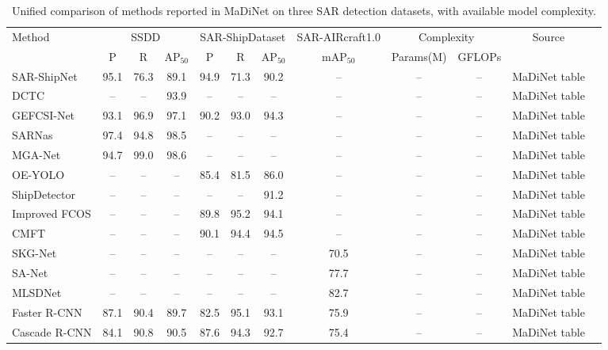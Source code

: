 \documentclass[10pt]{article}
\newcommand{\na}{--}
\begin{document}
\begin{landscape}
\begin{table}
\centering
\scriptsize
\setlength{\tabcolsep}{2.4pt}
\renewcommand{\arraystretch}{1.16}
\begin{threeparttable}
\caption{Unified comparison of methods reported in MaDiNet on three SAR detection datasets, with available model complexity.}
\label{tab:madinet_three_dataset_unified}
\begin{tabular}{lccccccccccc}
\toprule
\multirow{2}{*}{Method} &
\multicolumn{3}{c}{SSDD} &
\multicolumn{3}{c}{SAR-ShipDataset} &
\multicolumn{1}{c}{SAR-AIRcraft1.0} &
\multicolumn{2}{c}{Complexity} &
\multirow{2}{*}{Source} \\
\cmidrule(lr){2-4}\cmidrule(lr){5-7}\cmidrule(lr){8-8}\cmidrule(lr){9-10}
& P & R & AP$_{50}$ & P & R & AP$_{50}$ & mAP$_{50}$ & Params(M) & GFLOPs & \\
\midrule
SAR-ShipNet & 95.1 & 76.3 & 89.1 & 94.9 & 71.3 & 90.2 & \na & \na & \na & MaDiNet table \\
DCTC & \na & \na & 93.9 & \na & \na & \na & \na & \na & \na & MaDiNet table \\
GEFCSI-Net & 93.1 & 96.9 & 97.1 & 90.2 & 93.0 & 94.3 & \na & \na & \na & MaDiNet table \\
SARNas & 97.4 & 94.8 & 98.5 & \na & \na & \na & \na & \na & \na & MaDiNet table \\
MGA-Net & 94.7 & 99.0 & 98.6 & \na & \na & \na & \na & \na & \na & MaDiNet table \\
OE-YOLO & \na & \na & \na & 85.4 & 81.5 & 86.0 & \na & \na & \na & MaDiNet table \\
ShipDetector & \na & \na & \na & \na & \na & 91.2 & \na & \na & \na & MaDiNet table \\
Improved FCOS & \na & \na & \na & 89.8 & 95.2 & 94.1 & \na & \na & \na & MaDiNet table \\
CMFT & \na & \na & \na & 90.1 & 94.4 & 94.5 & \na & \na & \na & MaDiNet table \\
SKG-Net & \na & \na & \na & \na & \na & \na & 70.5 & \na & \na & MaDiNet table \\
SA-Net & \na & \na & \na & \na & \na & \na & 77.7 & \na & \na & MaDiNet table \\
MLSDNet & \na & \na & \na & \na & \na & \na & 82.7 & \na & \na & MaDiNet table \\
\midrule
Faster R-CNN & 87.1 & 90.4 & 89.7 & 82.5 & 95.1 & 93.1 & 75.9 & \na & \na & MaDiNet table \\
Cascade R-CNN & 84.1 & 90.8 & 90.5 & 87.6 & 94.3 & 92.7 & 75.4 & \na & \na & MaDiNet table \\

\end{tabular}
\end{threeparttable}
\end{table}
\end{landscape}
\end{document}
